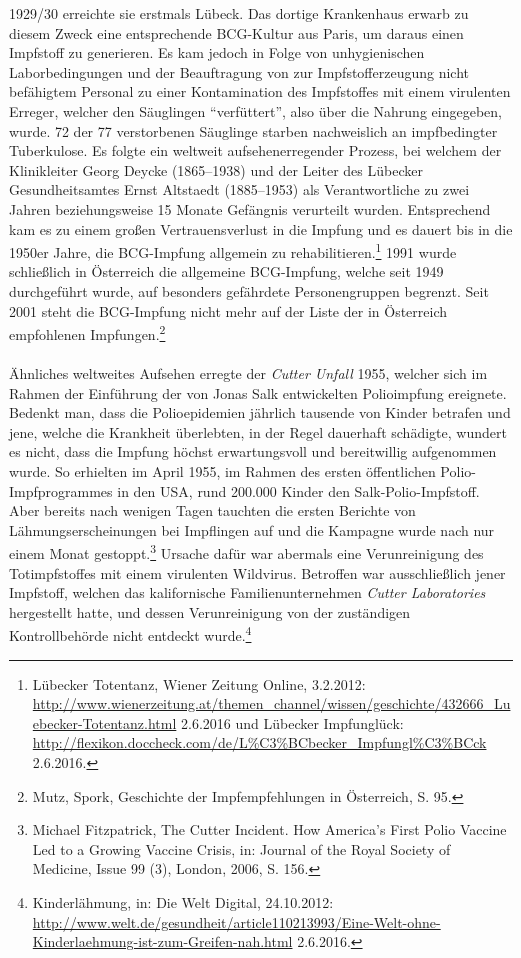 \documentclass[
    a4paper,
    12pt,
    hyphens,
    chapterprefix=true,
    headheight=33pt,
    footheight=29pt,
    headings=optiontohead,
]{scrartcl}
\begin{document}
1929/30 erreichte sie erstmals Lübeck. Das dortige Krankenhaus erwarb zu diesem Zweck eine entsprechende BCG-Kultur aus Paris,
um daraus einen Impfstoff zu generieren. Es kam jedoch in Folge von unhygienischen Laborbedingungen und der Beauftragung von zur Impfstofferzeugung
nicht befähigtem Personal zu einer Kontamination des Impfstoffes mit einem virulenten Erreger, welcher den Säuglingen "`verfüttert"',
also über die Nahrung eingegeben, wurde. 72 der 77 verstorbenen Säuglinge starben nachweislich an impfbedingter Tuberkulose.
Es folgte ein weltweit aufsehenerregender Prozess, bei welchem der Klinikleiter Georg Deycke (1865--1938) und der Leiter des Lübecker Gesundheitsamtes
Ernst Altstaedt (1885--1953) als Verantwortliche zu zwei Jahren beziehungsweise 15 Monate Gefängnis verurteilt wurden. Entsprechend kam es zu
einem großen Vertrauensverlust in die Impfung und es dauert bis in die 1950er Jahre, die BCG-Impfung allgemein zu rehabilitieren.\footnote{Lübecker Totentanz, Wiener Zeitung Online, 3.2.2012: \url{http://www.wienerzeitung.at/themen_channel/wissen/geschichte/432666_Luebecker-Totentanz.html} 2.6.2016 und
Lübecker Impfunglück: \url{http://flexikon.doccheck.com/de/L\%C3\%BCbecker_Impfungl\%C3\%BCck} 2.6.2016.}
1991 wurde schließlich in Österreich die allgemeine BCG-Impfung, welche seit 1949 durchgeführt wurde, auf besonders
gefährdete Personengruppen begrenzt. Seit 2001 steht die BCG-Impfung nicht mehr auf der Liste der in Österreich empfohlenen
Impfungen.\footnote{Mutz, Spork, Geschichte der Impfempfehlungen in Österreich, S. 95.}\\
\\
Ähnliches weltweites Aufsehen erregte der \textit{Cutter Unfall} 1955, welcher sich im Rahmen der Einführung der von Jonas
Salk entwickelten Polioimpfung ereignete. Bedenkt man, dass die Polioepidemien jährlich tausende von Kinder betrafen und jene,
welche die Krankheit überlebten, in der Regel dauerhaft schädigte, wundert es nicht, dass die Impfung höchst erwartungsvoll und bereitwillig aufgenommen wurde. So erhielten im April 1955, im Rahmen des ersten öffentlichen
Polio-Impfprogrammes in den USA, rund 200.000 Kinder den Salk-Polio-Impfstoff. Aber bereits nach wenigen Tagen tauchten die
ersten Berichte von Lähmungserscheinungen bei Impflingen auf und die Kampagne wurde nach nur einem Monat gestoppt.\footnote{Michael Fitzpatrick, The Cutter Incident. How America's First Polio Vaccine Led to a Growing Vaccine Crisis, in:
Journal of the Royal Society of Medicine, Issue 99 (3), London, 2006, S. 156.}
Ursache dafür war abermals eine Verunreinigung des Totimpfstoffes mit einem virulenten Wildvirus. Betroffen war ausschließlich jener Impfstoff, welchen das kalifornische Familienunternehmen \textit{Cutter Laboratories} hergestellt hatte, und dessen Verunreinigung von der zuständigen Kontrollbehörde nicht entdeckt wurde.\footnote{Kinderlähmung, in: Die Welt Digital,
24.10.2012: \url{http://www.welt.de/gesundheit/article110213993/Eine-Welt-ohne-Kinderlaehmung-ist-zum-Greifen-nah.html} 2.6.2016.}
\end{document}
